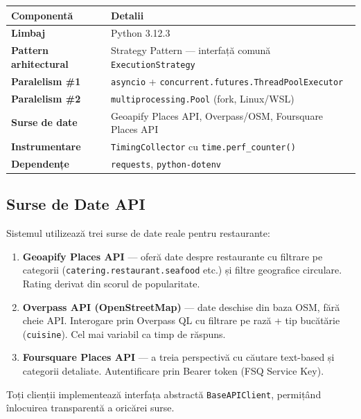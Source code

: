 \documentclass[12pt,a4paper]{article}
\newcommand{\thead}[1]{\cellcolor{tblh}\color{white}\textbf{#1}}
\begin{document}
\begin{center}
\begin{tabularx}{\textwidth}{lX}
\toprule
\thead{Componentă} & \thead{Detalii} \\
\midrule
\textbf{Limbaj} & Python 3.12.3 \\
\textbf{Pattern arhitectural} & Strategy Pattern --- interfață comună \texttt{ExecutionStrategy} \\
\textbf{Paralelism \#1} & \texttt{asyncio} + \texttt{concurrent.futures.ThreadPoolExecutor} \\
\textbf{Paralelism \#2} & \texttt{multiprocessing.Pool} (fork, Linux/WSL) \\
\textbf{Surse de date} & Geoapify Places API, Overpass/OSM, Foursquare Places API \\
\textbf{Instrumentare} & \texttt{TimingCollector} cu \texttt{time.perf\_counter()} \\
\textbf{Dependențe} & \texttt{requests}, \texttt{python-dotenv} \\
\bottomrule
\end{tabularx}
\end{center}

\subsection{Surse de Date API}

Sistemul utilizează trei surse de date reale pentru restaurante:

\begin{enumerate}
  \item \textbf{Geoapify Places API} --- oferă date despre restaurante cu filtrare pe categorii
        (\texttt{catering.restaurant.seafood} etc.) și filtre geografice circulare. Rating derivat din scorul de popularitate.

  \item \textbf{Overpass API (OpenStreetMap)} --- date deschise din baza OSM, fără cheie API.
        Interogare prin Overpass QL cu filtrare pe rază + tip bucătărie (\texttt{cuisine}). Cel mai variabil ca timp de răspuns.

  \item \textbf{Foursquare Places API} --- a treia perspectivă cu căutare text-based și categorii detaliate.
        Autentificare prin Bearer token (FSQ Service Key).
\end{enumerate}

Toți clienții implementează interfața abstractă \texttt{BaseAPIClient}, permițând înlocuirea transparentă a oricărei surse.
\end{document}
